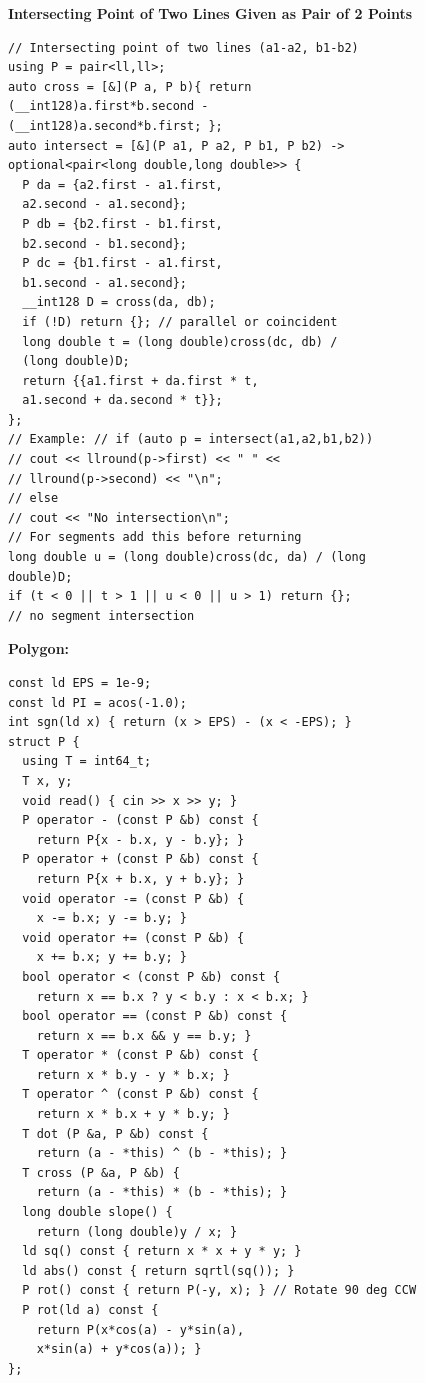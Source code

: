 \textbf{Intersecting Point of Two Lines Given as Pair of 2 Points}
\begin{lstlisting}
// Intersecting point of two lines (a1-a2, b1-b2)
using P = pair<ll,ll>;
auto cross = [&](P a, P b){ return
(__int128)a.first*b.second -
(__int128)a.second*b.first; };
auto intersect = [&](P a1, P a2, P b1, P b2) ->
optional<pair<long double,long double>> {
  P da = {a2.first - a1.first,
  a2.second - a1.second};
  P db = {b2.first - b1.first,
  b2.second - b1.second};
  P dc = {b1.first - a1.first,
  b1.second - a1.second};
  __int128 D = cross(da, db);
  if (!D) return {}; // parallel or coincident
  long double t = (long double)cross(dc, db) /
  (long double)D;
  return {{a1.first + da.first * t,
  a1.second + da.second * t}};
};
// Example: // if (auto p = intersect(a1,a2,b1,b2))
// cout << llround(p->first) << " " <<
// llround(p->second) << "\n";
// else
// cout << "No intersection\n";
// For segments add this before returning
long double u = (long double)cross(dc, da) / (long
double)D;
if (t < 0 || t > 1 || u < 0 || u > 1) return {};
// no segment intersection
\end{lstlisting}

\textbf{Polygon:}
\begin{lstlisting}
const ld EPS = 1e-9;
const ld PI = acos(-1.0);
int sgn(ld x) { return (x > EPS) - (x < -EPS); }
struct P {
  using T = int64_t;
  T x, y;
  void read() { cin >> x >> y; }
  P operator - (const P &b) const {
    return P{x - b.x, y - b.y}; }
  P operator + (const P &b) const {
    return P{x + b.x, y + b.y}; }
  void operator -= (const P &b) {
    x -= b.x; y -= b.y; }
  void operator += (const P &b) {
    x += b.x; y += b.y; }
  bool operator < (const P &b) const {
    return x == b.x ? y < b.y : x < b.x; }
  bool operator == (const P &b) const {
    return x == b.x && y == b.y; }
  T operator * (const P &b) const {
    return x * b.y - y * b.x; }
  T operator ^ (const P &b) const {
    return x * b.x + y * b.y; }
  T dot (P &a, P &b) const {
    return (a - *this) ^ (b - *this); }
  T cross (P &a, P &b) {
    return (a - *this) * (b - *this); }
  long double slope() {
    return (long double)y / x; }
  ld sq() const { return x * x + y * y; }
  ld abs() const { return sqrtl(sq()); }
  P rot() const { return P(-y, x); } // Rotate 90 deg CCW
  P rot(ld a) const {
    return P(x*cos(a) - y*sin(a),
    x*sin(a) + y*cos(a)); }
};
\end{lstlisting}

